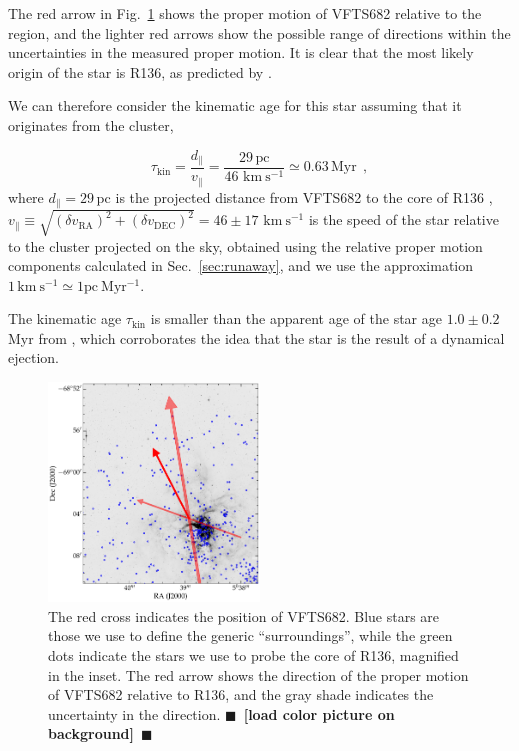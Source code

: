 \documentclass[apjl,twocolumn]{emulateapj}
\newcommand{\todo}[1]{{\large $\blacksquare$~\textbf{\color{red}[#1]}}~$\blacksquare$}
\newcommand{\kms}{{\,\mathrm{km\ s^{-1}}}}
\DeclareRobustCommand{\Figref}[1]{Fig.~\ref{#1}}
\DeclareRobustCommand{\Secref}[1]{Sec.~\ref{#1}}
\begin{document}
The red arrow in \Figref{fig:main} shows the proper motion of VFTS682
relative to the region, and the lighter red arrows show the possible
range of directions within the uncertainties in the measured proper
motion. It is clear that the most likely origin of the star is R136,
as predicted by \cite{fujii:11, banerjee:12}.


We can therefore consider the kinematic age for this star assuming
that it originates from the cluster,

\begin{equation}
  \label{eq:kin_age}
  \tau_\mathrm{kin} = \frac{d_\parallel}{v_\parallel} =
  \frac{29\,\mathrm{pc}}{46\,\kms} \simeq 0.63\, \mathrm{Myr} \ \ ,
\end{equation}
where $d_\parallel =29$\,pc is the projected distance from VFTS682 to
the core of R136 \citep[][]{bestenlehner:11}, $v_\parallel \equiv \sqrt{\left(\delta v_\mathrm{RA}\right)^2
    +\left(\delta v_\mathrm{DEC}\right)^2} =46\pm
17\,\kms$ is the speed of the star relative to the cluster projected on the sky, obtained
using the relative proper motion components calculated in
\Secref{sec:runaway}, and we use the approximation $1 \kms \simeq 1
\mathrm{pc \ Myr^{-1}}$.

The kinematic age $\tau_\mathrm{kin}$ is smaller than the apparent age
of the star age $1.0\pm 0.2$\,Myr from \cite{schneider:18}, which
corroborates the idea that the star is the result of a dynamical
ejection. 

\begin{figure}[htbp]
  \centering
  \includegraphics[width=0.5\textwidth]{./figures/main_plot}  
  \caption{The red cross indicates the position of VFTS682. Blue stars
    are those we use to define the generic ``surroundings'', while the
    green dots indicate the stars we use to probe the core of R136,
    magnified in the inset. The red arrow shows the direction of the
    proper motion of VFTS682 relative to R136, and the gray shade
    indicates the uncertainty in the direction. \todo{load color picture on background}}
  \label{fig:main}
\end{figure}
\end{document}
